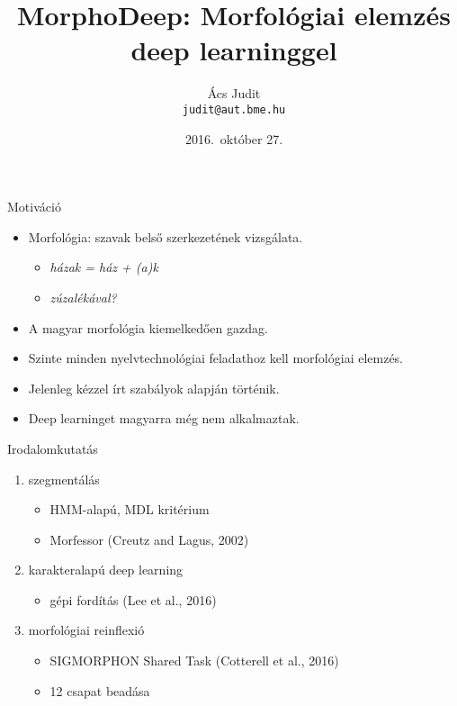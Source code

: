 \documentclass[xcolor=rgb]{beamer}
\title{MorphoDeep: Morfológiai elemzés deep learninggel}
\author[\'Acs Judit]{\'Acs Judit\\ \texttt{judit@aut.bme.hu}}
\institute{BME AUT}
\date{2016.~október 27.}
\begin{document}
  
\begin{frame}
\titlepage 
\end{frame}

\begin{frame}{Motiváció}
    \begin{itemize}
        \item Morfológia: szavak belső szerkezetének vizsgálata.
            \begin{itemize}
                \item \emph{házak = ház + (a)k}
                \item \emph{zúzalékával?}
            \end{itemize}
        \item A magyar morfológia kiemelkedően gazdag.
        \item Szinte minden nyelvtechnológiai feladathoz kell morfológiai elemzés.
        \item Jelenleg kézzel írt szabályok alapján történik.
        \item Deep learninget magyarra még nem alkalmaztak.
    \end{itemize}
\end{frame}

\begin{frame}{Irodalomkutatás}
    \begin{enumerate}
        \item szegmentálás
            \begin{itemize}
                \item HMM-alapú, MDL kritérium
                \item Morfessor (Creutz and Lagus, 2002)\nocite{Creutz:2002}
            \end{itemize}
        \item karakteralapú deep learning
            \begin{itemize}
                \item gépi fordítás (Lee et al., 2016)\nocite{Lee:2016}
            \end{itemize}
        \item morfológiai reinflexió
            \begin{itemize}
                \item SIGMORPHON Shared Task (Cotterell et al., 2016)\nocite{Cotterell:2016}
                \item 12 csapat beadása
            \end{itemize}
    \end{enumerate}
\end{frame}
\end{document}
